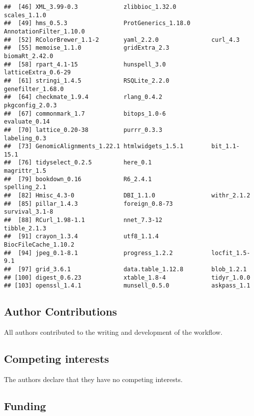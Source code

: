 \documentclass[
]{article}
\begin{document}
\begin{verbatim}
##  [46] XML_3.99-0.3             zlibbioc_1.32.0          scales_1.1.0            
##  [49] hms_0.5.3                ProtGenerics_1.18.0      AnnotationFilter_1.10.0 
##  [52] RColorBrewer_1.1-2       yaml_2.2.0               curl_4.3                
##  [55] memoise_1.1.0            gridExtra_2.3            biomaRt_2.42.0          
##  [58] rpart_4.1-15             hunspell_3.0             latticeExtra_0.6-29     
##  [61] stringi_1.4.5            RSQLite_2.2.0            genefilter_1.68.0       
##  [64] checkmate_1.9.4          rlang_0.4.2              pkgconfig_2.0.3         
##  [67] commonmark_1.7           bitops_1.0-6             evaluate_0.14           
##  [70] lattice_0.20-38          purrr_0.3.3              labeling_0.3            
##  [73] GenomicAlignments_1.22.1 htmlwidgets_1.5.1        bit_1.1-15.1            
##  [76] tidyselect_0.2.5         here_0.1                 magrittr_1.5            
##  [79] bookdown_0.16            R6_2.4.1                 spelling_2.1            
##  [82] Hmisc_4.3-0              DBI_1.1.0                withr_2.1.2             
##  [85] pillar_1.4.3             foreign_0.8-73           survival_3.1-8          
##  [88] RCurl_1.98-1.1           nnet_7.3-12              tibble_2.1.3            
##  [91] crayon_1.3.4             utf8_1.1.4               BiocFileCache_1.10.2    
##  [94] jpeg_0.1-8.1             progress_1.2.2           locfit_1.5-9.1          
##  [97] grid_3.6.1               data.table_1.12.8        blob_1.2.1              
## [100] digest_0.6.23            xtable_1.8-4             tidyr_1.0.0             
## [103] openssl_1.4.1            munsell_0.5.0            askpass_1.1
\end{verbatim}

\hypertarget{author-contributions}{%
\subsection{Author Contributions}\label{author-contributions}}

All authors contributed to the writing and development of the workflow.

\hypertarget{competing-interests}{%
\subsection{Competing interests}\label{competing-interests}}

The authors declare that they have no competing interests.

\hypertarget{funding}{%
\subsection{Funding}\label{funding}}
\end{document}
